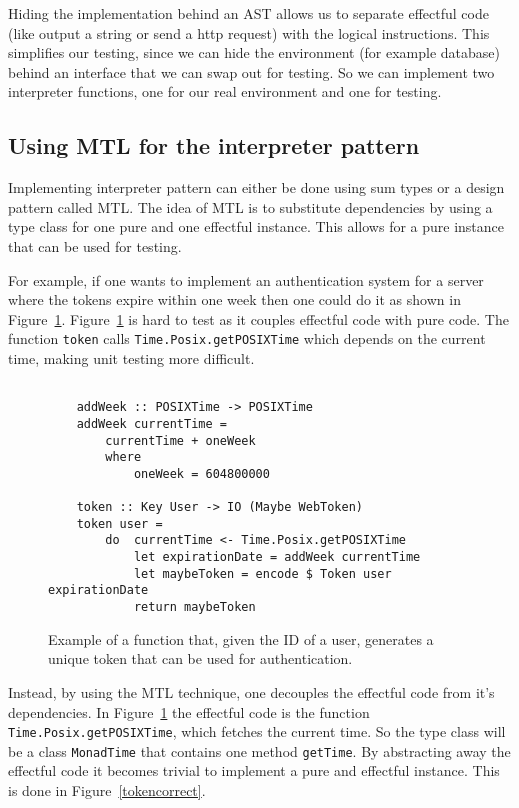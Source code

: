 Hiding the implementation behind an AST allows us to separate effectful code
(like output a string or send a http request) with the logical instructions.
This simplifies our testing, since we can hide the environment (for example
database) behind an interface that we can swap out for testing. So we can
implement two interpreter functions, one for our real environment and one for
testing. 

\subsection{Using MTL for the interpreter pattern}\label{mtl}

Implementing interpreter pattern can either be done using sum types or a design
pattern called MTL. The idea of MTL is to substitute dependencies by using a
type class for one pure and one effectful instance. This allows for a pure
instance that can be used for testing.

For example, if one wants to implement an authentication system for a server
where the tokens expire within one week then one could do it as shown in
Figure~\ref{tokennaive}. Figure~\ref{tokennaive} is hard to test as it couples
effectful code with pure code. The function \texttt{token} calls
\texttt{Time.Posix.getPOSIXTime} which depends on the current time,
making unit testing more difficult.

\begin{figure}[H]
    \begin{lstlisting}

    addWeek :: POSIXTime -> POSIXTime
    addWeek currentTime =
        currentTime + oneWeek
        where
            oneWeek = 604800000

    token :: Key User -> IO (Maybe WebToken)
    token user =
        do  currentTime <- Time.Posix.getPOSIXTime
            let expirationDate = addWeek currentTime
            let maybeToken = encode $ Token user expirationDate
            return maybeToken
    \end{lstlisting}
    \caption{Example of a function that, given the ID of a user, generates a
    unique token that can be used for authentication.}
    \label{tokennaive}
\end{figure}

Instead, by using the MTL technique, one decouples the effectful code from it's
dependencies. In Figure~\ref{tokennaive} the effectful code is the function
\texttt{Time.Posix.getPOSIXTime}, which fetches the current time. So the type
class will be a class \texttt{MonadTime} that contains one method
\texttt{getTime}. By abstracting away the effectful code it becomes trivial to
implement a pure and effectful instance. This is done in
Figure~\ref{tokencorrect}. 

